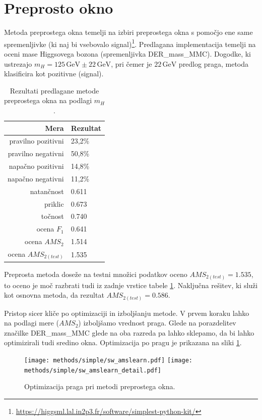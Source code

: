 \documentclass[11pt,a4paper,openany]{book}
\begin{document}
	
\section{Preprosto okno}

Metoda preprostega okna temelji na izbiri preprostega okna s pomočjo ene same spremenljivke (ki naj bi vsebovalo signal)\footnote{\url{https://higgsml.lal.in2p3.fr/software/simplest-python-kit/}}. Predlagana implementacija temelji na oceni mase Higgsovega bozona (spremenljivka DER\_mass\_MMC). Dogodke, ki ustrezajo $m_H = 125\,\text{GeV} \pm 22\,\text{GeV}$, pri čemer je $22\,\text{GeV}$ predlog praga, metoda klasificira kot pozitivne (signal).

\begin{table}[ht]
	\centering
	\begin{tabular}{rl}
		\hline
		\textbf{Mera} & \textbf{Rezultat} \\
		\hline
		pravilno pozitivni & 23,2\%\\
		pravilno negativni & 50,8\% \\
		napačno pozitivni & 14,8\% \\
		napačno negativni & 11,2\% \\
		natančnost & 0.611 \\
		priklic & 0.673 \\
		točnost & 0.740 \\
		ocena $F_1$ & 0.641 \\
		ocena $AMS_2$ & 1.514 \\
		ocena $AMS_{2(test)}$ & 1.535 		
	\end{tabular}
	\caption{Rezultati predlagane metode preprostega okna na podlagi $m_H$.}
	\label{tb:preprosto_okno}
\end{table}

Preprosta metoda doseže na testni množici podatkov oceno $AMS_{2(test)} = 1.535$, to oceno je moč razbrati tudi iz zadnje vrstice tabele \ref{tb:preprosto_okno}. Naključna rešitev, ki služi kot osnovna metoda, da rezultat $AMS_{2{(test)}} = 0.586$.

Pristop sicer kliče po optimizaciji in izboljšanju metode. V prvem koraku lahko na podlagi mere ($AMS_2$) izboljšamo vrednost praga. Glede na porazdelitev značilke DER\_mass\_MMC glede na oba razreda pa lahko sklepamo, da bi lahko optimizirali tudi sredino okna. Optimizacija po pragu je prikazana na sliki \ref{sl:simple_optimization_threshold}.

\begin{figure}[h]
	\centering	
	\texttt{[image: methods/simple/sw\_amslearn.pdf]}
	\texttt{[image: methods/simple/sw\_amslearn\_detail.pdf]}		
	
	\caption{Optimizacija praga pri metodi preprostega okna.}
	\label{sl:simple_optimization_threshold}
\end{figure}
\end{document}
